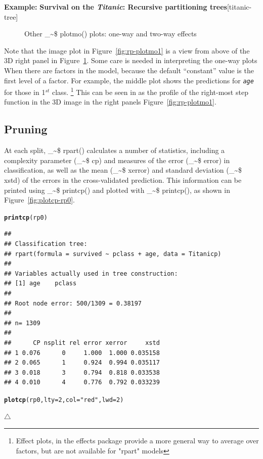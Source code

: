 \documentclass{article}
\makeatletter
\newcommand{\hlnum}[1]{\textcolor[rgb]{0.686,0.059,0.569}{#1}}%
\newcommand{\hlstr}[1]{\textcolor[rgb]{0.192,0.494,0.8}{#1}}%
\newcommand{\hlstd}[1]{\textcolor[rgb]{0.345,0.345,0.345}{#1}}%
\newcommand{\hlkwc}[1]{\textcolor[rgb]{0.333,0.667,0.333}{#1}}%
\newcommand{\hlkwd}[1]{\textcolor[rgb]{0.737,0.353,0.396}{\textbf{#1}}}%
\newenvironment{kframe}{%
 \def\at@end@of@kframe{}%
 \ifinner\ifhmode%
  \def\at@end@of@kframe{\end{minipage}}%
  \begin{minipage}{\columnwidth}%
 \fi\fi%
 \def\FrameCommand##1{\hskip\@totalleftmargin \hskip-\fboxsep
 \colorbox{shadecolor}{##1}\hskip-\fboxsep
     \hskip-\linewidth \hskip-\@totalleftmargin \hskip\columnwidth}%
 \MakeFramed {\advance\hsize-\width
   \@totalleftmargin\z@ \linewidth\hsize
   \@setminipage}}%
 {\par\unskip\endMakeFramed%
 \at@end@of@kframe}
\newenvironment{knitrout}{}{} %
\newcommand{\figref}[1]{Figure~\ref{#1}}
\newcommand{\var}[1]{\textit{\texttt{#1}}}
\newcommand{\class}[1]{\textsf{"#1"}}
\newcommand\code{\bgroup\@makeother\_\@makeother\~\@makeother\$\@codex}
\def\@codex#1{{\normalfont\ttfamily\hyphenchar\font=-1 #1}\egroup}
\newcommand{\func}[1]{\code{#1()}}
\newcommand{\pkg}[1]{\textsf{#1}\nocite{R-#1}}
\newcommand{\Rpackage}[1]{\pkg{#1} package}
\newenvironment{Example}[2][unnamed-example]%
  {\medskip\noindent\textbf{\textsf{Example:}}
   \textbf{#2}\hfill [#1]\par\smallskip
  }
  {\hfill $\triangle$}
\makeatother
\begin{document}
\begin{Example}[titanic-tree]{Survival on the \emph{Titanic}: Recursive partitioning trees}
\begin{knitrout}
\begin{figure}[hbt!]
{}

\caption[Other \func{plotmo} plots]{Other \func{plotmo} plots: one-way and two-way effects}\label{fig:rp-plotmo2}
\end{figure}


\end{knitrout}
Note that the image plot in \figref{fig:rp-plotmo1} is a view from above of the
3D right panel in \figref{fig:rp-plotmo2}. Some care is needed in interpreting the
one-way plots When there are factors in the model, because the default
``constant'' value is the first level of a factor.
For example, the middle plot shows the predictions for \var{age} for those
in 1$^{st}$ class.%
\footnote{
Effect plots, in the \Rpackage{effects} provide a more general way to average
over factors, but are not available for \class{rpart} models
}
This can be seen in as the profile of the right-most 
step function in the 3D image in the right panels \figref{fig:rp-plotmo1}.

\subsection*{Pruning}
At each split, \func{rpart} calculates a number of statistics, including
a complexity parameter (\code{cp}) and measures of the error (\code{error}) 
in classification,
as well as the mean (\code{xerror}) and standard deviation (\code{xstd})
of the errors in the cross-validated prediction.
This information can be printed using \func{printcp} and plotted with \func{printcp},
as shown in \figref{fig:plotcp-rp0}.
\begin{knitrout}
\color{fgcolor}\begin{kframe}
\begin{alltt}
\hlkwd{printcp}\hlstd{(rp0)}
\end{alltt}
\begin{verbatim}
## 
## Classification tree:
## rpart(formula = survived ~ pclass + age, data = Titanicp)
## 
## Variables actually used in tree construction:
## [1] age    pclass
## 
## Root node error: 500/1309 = 0.38197
## 
## n= 1309 
## 
##      CP nsplit rel error xerror     xstd
## 1 0.076      0     1.000  1.000 0.035158
## 2 0.065      1     0.924  0.994 0.035117
## 3 0.018      3     0.794  0.818 0.033538
## 4 0.010      4     0.776  0.792 0.033239
\end{verbatim}
\end{kframe}
\end{knitrout}
\begin{knitrout}
\color{fgcolor}\begin{kframe}
\begin{alltt}
\hlkwd{plotcp}\hlstd{(rp0,} \hlkwc{lty}\hlstd{=}\hlnum{2}\hlstd{,} \hlkwc{col}\hlstd{=}\hlstr{"red"}\hlstd{,} \hlkwc{lwd}\hlstd{=}\hlnum{2}\hlstd{)}
\end{alltt}
\end{kframe}\begin{figure}[hbt!]


\end{figure}
\end{knitrout}
\end{Example}
\end{document}
